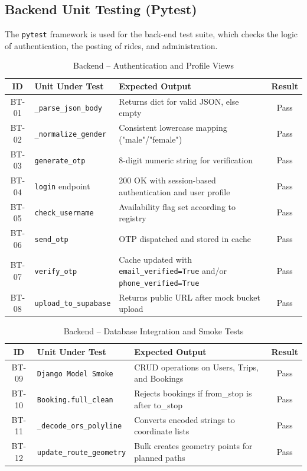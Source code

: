 \subsection{Backend Unit Testing (Pytest)}

The \texttt{pytest} framework is used for the back-end test suite, which checks the logic of authentication, the posting of rides, and administration.

\begin{table}[H]
\centering
\caption{Backend – Authentication and Profile Views}
\renewcommand{\arraystretch}{1.3}
\begin{tabularx}{\textwidth}{|c|X|X|c|}
\hline
\textbf{ID} & \textbf{Unit Under Test} & \textbf{Expected Output} & \textbf{Result} \\
\hline
BT-01 & \texttt{\_parse\_json\_body} & Returns dict for valid JSON, else empty & Pass \\
\hline
BT-02 & \texttt{\_normalize\_gender} & Consistent lowercase mapping ("male"/"female") & Pass \\
\hline
BT-03 & \texttt{generate\_otp} & 8-digit numeric string for verification & Pass \\
\hline
BT-04 & \texttt{login} endpoint & 200 OK with session-based authentication and user profile & Pass \\
\hline
BT-05 & \texttt{check\_username} & Availability flag set according to registry & Pass \\
\hline
BT-06 & \texttt{send\_otp} & OTP dispatched and stored in cache & Pass \\
\hline
BT-07 & \texttt{verify\_otp} & Cache updated with \texttt{email\_verified=True} and/or \texttt{phone\_verified=True} & Pass \\
\hline
BT-08 & \texttt{upload\_to\_supabase} & Returns public URL after mock bucket upload & Pass \\
\hline
\end{tabularx}
\end{table}

\begin{table}[H]
\centering
\caption{Backend – Database Integration and Smoke Tests}
\renewcommand{\arraystretch}{1.3}
\begin{tabularx}{\textwidth}{|c|X|X|c|}
\hline
\textbf{ID} & \textbf{Unit Under Test} & \textbf{Expected Output} & \textbf{Result} \\
\hline
BT-09 & \texttt{Django Model Smoke} & CRUD operations on Users, Trips, and Bookings & Pass \\
\hline
BT-10 & \texttt{Booking.full\_clean} & Rejects bookings if from\_stop is after to\_stop & Pass \\
\hline
BT-11 & \texttt{\_decode\_ors\_polyline} & Converts encoded strings to coordinate lists & Pass \\
\hline
BT-12 & \texttt{update\_route\_geometry} & Bulk creates geometry points for planned paths & Pass \\
\hline
\end{tabularx}
\end{table}

